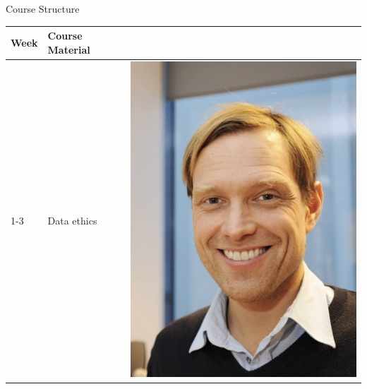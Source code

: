 \documentclass[
    NAME={Dr. Helga Ingimundardóttir},
    EMAIL={helgaingim@hi.is},
    FACULTY={Industrial Engineering},
    TITLE={Business Intelligence},
    SUBTITLE={Introduction},
    SEMINAR={IÐN610M},
    DATE={Spring, 2024}
]{HI-LaTeX/hi-beamer}
\begin{document}
    \begin{frame}{Course Structure}
        \begin{table}
            \begin{tabular}{m{1.5cm} m{8cm} m{2.5cm}}
                \textbf{Week} & \textbf{Course Material}                      &                                                            \\\hline
                1-3           & Data ethics                                   & \includegraphics[height=.1\textheight]{figures/hah}        \\

\end{tabular}
\end{table}
\end{frame}
\end{document}
